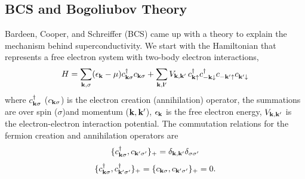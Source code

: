 \subsection{BCS and Bogoliubov Theory}
Bardeen, Cooper, and Schreiffer (BCS) came up with a theory to explain the mechanism behind superconductivity. We start with the Hamiltonian that represents a free electron system with two-body electron interactions,
\begin{equation}
H=\sum_{\bf{k},\sigma} (\epsilon_{\bf{k}}-\mu)
c^{\dagger}_{\bf{k}\sigma}
c_{\bf{k}\sigma}+
\sum_{\bf{k},\bf{l'}}
V_{\bf{k},\bf{k'}}\, 
c^{\dagger}_{\bf{k}\uparrow}
c^{\dagger}_{-\bf{k}\downarrow} 
c^{}_{-\bf{k'}\uparrow}
c^{}_{\bf{k'}\downarrow}
\end{equation}
where $c^{\dagger}_{\bf{k}\sigma}$ ($c_{\bf{k}\sigma}$) is the electron creation (annihilation) operator, the summations are over spin ($\sigma$)and momentum ($\bf{k},\bf{k'}$), $\epsilon_{\bf{k}}$ is the free electron energy, $V_{\bf{k,k'}}$ is the electron-electron interaction potential. The commutation relations for the fermion creation and annihilation operators are
\begin{equation}
\{c^{\dagger}_{\bf{k}\sigma},c_{\bf{k'}\sigma'}\}_+=\delta_{\bf{k},\bf{k'}}\delta_{\sigma \sigma'}
\end{equation}
\begin{equation}
\{c^{\dagger}_{\bf{k}\sigma},c^{\dagger}_{\bf{k'}\sigma'}\}_+=\{c_{\bf{k}\sigma},c_{\bf{k'}\sigma'}\}_+=0.
\end{equation}

